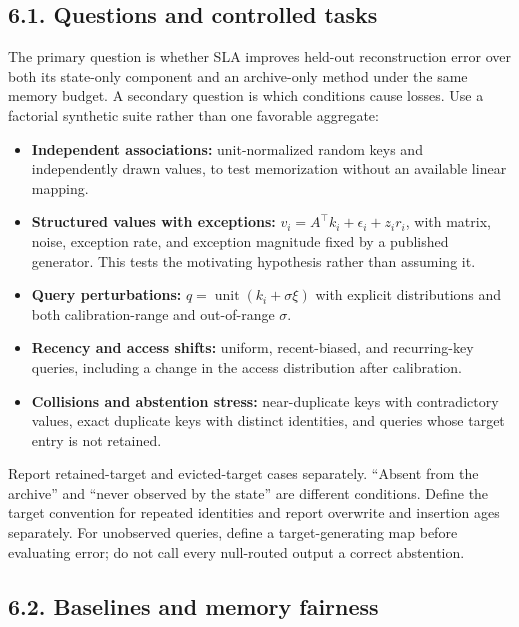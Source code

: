 \documentclass[11pt,a4paper]{article}
\providecommand{\tightlist}{\setlength{\itemsep}{0pt}\setlength{\parskip}{0pt}}
\begin{document}
\subsection{6.1. Questions and controlled tasks}\label{questions-and-controlled-tasks}

The primary question is whether SLA improves held-out reconstruction error over both its state-only component and an archive-only method under the same memory budget. A secondary question is which conditions cause losses. Use a factorial synthetic suite rather than one favorable aggregate:

\begin{itemize}
\tightlist
\item
  \textbf{Independent associations:} unit-normalized random keys and independently drawn values, to test memorization without an available linear mapping.
\item
  \textbf{Structured values with exceptions:} \(v_i=A^{\top}k_i+\epsilon_i+z_i r_i\), with matrix, noise, exception rate, and exception magnitude fixed by a published generator. This tests the motivating hypothesis rather than assuming it.
\item
  \textbf{Query perturbations:} \(q=\operatorname{unit}(k_i+\sigma\xi)\) with explicit distributions and both calibration-range and out-of-range \(\sigma\).
\item
  \textbf{Recency and access shifts:} uniform, recent-biased, and recurring-key queries, including a change in the access distribution after calibration.
\item
  \textbf{Collisions and abstention stress:} near-duplicate keys with contradictory values, exact duplicate keys with distinct identities, and queries whose target entry is not retained.
\end{itemize}

Report retained-target and evicted-target cases separately. ``Absent from the archive'' and ``never observed by the state'' are different conditions. Define the target convention for repeated identities and report overwrite and insertion ages separately. For unobserved queries, define a target-generating map before evaluating error; do not call every null-routed output a correct abstention.

\subsection{6.2. Baselines and memory fairness}\label{baselines-and-memory-fairness}
\end{document}

